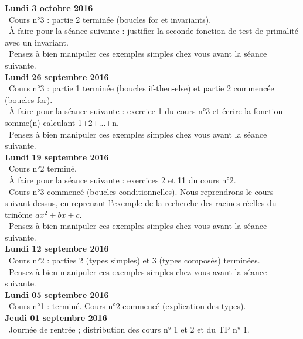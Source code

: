 \documentclass[12pt,a4paper]{article}
\begin{document}
\noindent\textbf{Lundi 3 octobre 2016 }\\
\bu\ Cours n°3 : partie 2 terminée (boucles for et invariants). \\
\bu\ À faire pour la séance suivante : justifier la seconde fonction de test de primalité avec un invariant. \\
\bu\ Pensez à bien manipuler ces exemples simples chez vous avant la séance suivante. \vspace{.4cm}\\

\noindent\textbf{Lundi 26 septembre 2016 }\\
\bu\ Cours n°3 : partie 1 terminée (boucles if-then-else) et partie 2 commencée (boucles for). \\
\bu\ À faire pour la séance suivante : exercice 1 du cours n°3 et écrire la fonction somme(n) calculant 1+2+...+n. \\
\bu\ Pensez à bien manipuler ces exemples simples chez vous avant la séance suivante. \vspace{.4cm}\\


\noindent\textbf{Lundi 19 septembre 2016 }\\
\bu\ Cours n°2 terminé. \\
\bu\ À faire pour la séance suivante : exercices 2 et 11 du cours n°2. \\
\bu\ Cours n°3 commencé (boucles conditionnelles). Nous reprendrons le cours suivant dessus, en reprenant l'exemple de la recherche des racines réelles du trinôme $ax^2+bx+c$. \\
\bu\ Pensez à bien manipuler ces exemples simples chez vous avant la séance suivante. \vspace{.4cm}\\

\noindent\textbf{Lundi 12 septembre 2016 }\\
\bu\ Cours n°2 : parties 2 (types simples) et 3 (types composés) terminées. \\
\bu\ Pensez à bien manipuler ces exemples simples chez vous avant la séance suivante. \vspace{.4cm}\\

\noindent\textbf{Lundi 05 septembre 2016 }\\
\bu\ Cours n°1 : terminé. Cours n°2 commencé (explication des types). \vspace{.4cm}\\

\noindent\textbf{Jeudi 01 septembre 2016 }\\
\bu\ Journée de rentrée ; distribution des cours n° 1 et 2 et du TP n° 1. 

\label{end}
\end{document}
